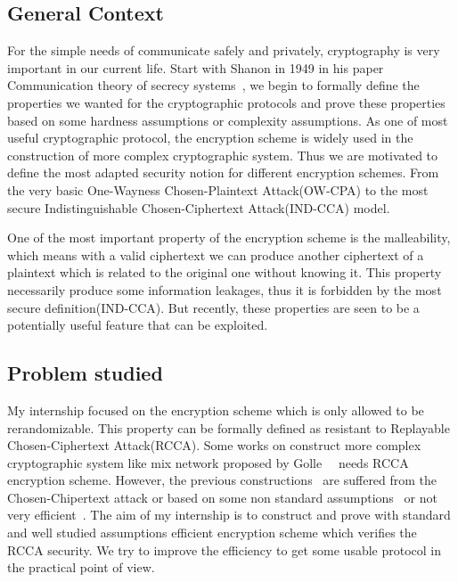 \subsection*{General Context}

For the simple needs of communicate safely and privately, cryptography is very important in our current life. 
Start with Shanon in 1949 in his paper Communication theory of secrecy systems~\cite{shannon-otp},
we begin to formally define the properties we wanted for the cryptographic protocols and prove these properties based on some hardness assumptions or complexity assumptions.
As one of most useful cryptographic protocol, the encryption scheme is widely used in the construction of more complex cryptographic system.
Thus we are motivated to define the most adapted security notion for different encryption schemes. 
From the very basic One-Wayness Chosen-Plaintext Attack(OW-CPA) to the most secure Indistinguishable Chosen-Ciphertext Attack(IND-CCA) model. 

One of the most important property of the encryption scheme is the malleability, 
which means with a valid ciphertext we can produce another ciphertext of a plaintext which is related to the original one without knowing it.
This property necessarily produce some information leakages,
thus it is forbidden by the most secure definition(IND-CCA).
But recently, these properties are seen to be a potentially useful feature that can be exploited.

\subsection*{Problem studied}
My internship focused on the encryption scheme which is only allowed to be rerandomizable.
This property can be formally defined as resistant to Replayable Chosen-Ciphertext Attack(RCCA).
Some works on construct more complex cryptographic system like mix network proposed by Golle~\etal~\cite{DBLP:conf/ctrsa/GolleJJS04} needs RCCA encryption scheme.
However, the previous constructions~\cite{DBLP:conf/ctrsa/GolleJJS04} are suffered from the Chosen-Chipertext attack or based on some non standard assumptions~\cite{DBLP:conf/crypto/PrabhakaranR07} or not very efficient~\cite{DBLP:conf/eurocrypt/ChaseKLM12}.
The aim of my internship is to construct and prove with standard and well studied assumptions efficient encryption scheme which verifies the RCCA security.
We try to improve the efficiency to get some usable protocol in the practical point of view.

